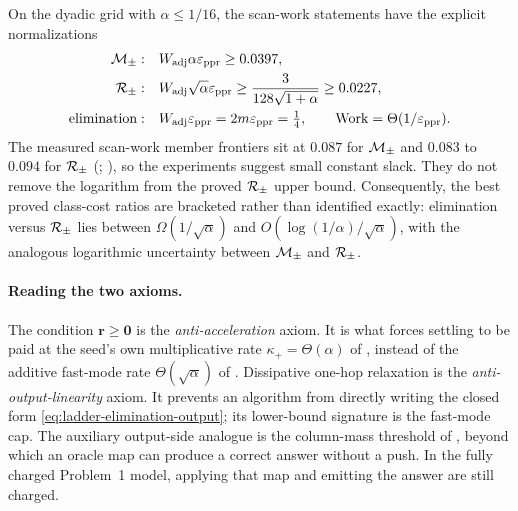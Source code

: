 On the dyadic grid with $\alpha\le1/16$, the scan-work statements have the
explicit normalizations
\begin{equation}
\begin{aligned}
    \mathcal{M}_{\pm}:&\quad W_{\mathrm{adj}}\alpha\varepsilon_{\mathrm{ppr}}\ge0.0397,\\
    \mathcal{R}_{\pm}:&\quad W_{\mathrm{adj}}\sqrt\alpha\varepsilon_{\mathrm{ppr}}
        \ge\frac{3}{128\sqrt{1+\alpha}}\ge0.0227,\\
    \text{elimination}:&\quad
        W_{\mathrm{adj}}\varepsilon_{\mathrm{ppr}}=2m\varepsilon_{\mathrm{ppr}}=\tfrac14,
        \qquad \operatorname{Work}=\Theta(1/\varepsilon_{\mathrm{ppr}}).
\end{aligned}
    \label{eq:ladder-constants}
\end{equation}
The measured scan-work member frontiers sit at $0.087$ for $\mathcal{M}_{\pm}$ and
$0.083$ to $0.094$ for $\mathcal{R}_{\pm}$ (\statusmeasured;
), so the experiments suggest small constant
slack. They do not remove the logarithm from the proved $\mathcal{R}_{\pm}$ upper bound.
Consequently, the best proved class-cost ratios are bracketed rather than
identified exactly: elimination versus $\mathcal{R}_{\pm}$ lies between
$\Omega(1/\sqrt\alpha)$ and
$O(\log(1/\alpha)/\sqrt\alpha)$, with the analogous logarithmic uncertainty
between $\mathcal{M}_{\pm}$ and $\mathcal{R}_{\pm}$.

\paragraph{Reading the two axioms.}
The condition $\bm{r}\ge\bm{0}$ is the \emph{anti-acceleration} axiom. It is
what forces settling to be paid at the seed's own multiplicative rate
$\kappa_{+}=\Theta(\alpha)$ of , instead of the
additive fast-mode rate $\Theta(\sqrt\alpha)$ of
. Dissipative one-hop relaxation is the
\emph{anti-output-linearity} axiom. It prevents an algorithm from directly
writing the closed form \eqref{eq:ladder-elimination-output}; its lower-bound
signature is the fast-mode cap. The auxiliary output-side analogue is the
column-mass threshold of , beyond which an oracle map
can produce a correct answer without a push. In the fully charged Problem~1
model, applying that map and emitting the answer are still charged.
